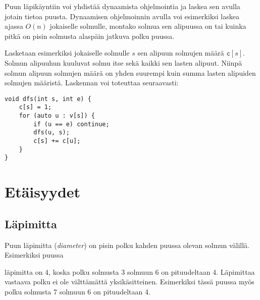Puun läpikäyntiin voi yhdistää dynaamista
ohjelmointia ja laskea sen avulla jotain tietoa puusta.
Dynaamisen ohjelmoinnin avulla voi esimerkiksi
laskea ajassa $O(n)$ jokaiselle solmulle,
montako solmua sen alipuussa
on tai kuinka pitkä on pisin solmusta
alaspäin jatkuva polku puussa.

Lasketaan esimerkiksi jokaiselle solmulle $s$
sen alipuun solmujen määrä $\texttt{c}[s]$.
Solmun alipuuhun kuuluvat solmu itse
sekä kaikki sen lasten alipuut.
Niinpä solmun alipuun solmujen määrä on
yhden suurempi kuin summa lasten
alipuiden solmujen määristä.
Laskennan voi toteuttaa seuraavasti:

\begin{lstlisting}
void dfs(int s, int e) {
    c[s] = 1;
    for (auto u : v[s]) {
        if (u == e) continue;
        dfs(u, s);
        c[s] += c[u];
    }
}
\end{lstlisting}

\section{Etäisyydet}

\subsection{Läpimitta}

Puun läpimitta (\textit{diameter}) on pisin polku
kahden puussa olevan solmun välillä.
Esimerkiksi puussa
\begin{center}
\end{center}

läpimitta on 4, koska polku solmusta 3 solmuun 6
on pituudeltaan 4.
Läpimittaa vastaava polku ei ole
välttämättä yksikäsitteinen.
Esimerkiksi tässä puussa myös polku solmusta 7
solmuun 6 on pituudeltaan 4.

